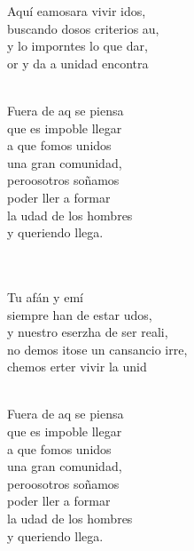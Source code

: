\documentclass[12pt]{article}
\begin{document}
\begin{multicols*}{2}
\begin{cancion}%
	Aquí eamosara vivir idos,\\
	buscando dosos criterios au,\\
	y lo imporntes lo que dar,\\
	or y da a unidad encontra  \\\jump\\
	\begin{chorus}%
	Fuera de aq se piensa  \\
	que es impoble llegar\\
	a que fomos unidos \\
una gran comunidad,\\
	peroosotros soñamos \\
	poder ller a formar\\
	la udad de los hombres \\
	y queriendo llega.\\
	\end{chorus}%
	\jump\\
	      \\
	Tu afán y emí \\
	siempre han de estar udos, \\
	y nuestro eserzha de ser reali,\\
	no demos itose un cansancio irre,\\
	chemos erter vivir la unid\\\jump\\
	\begin{chorus}%
	Fuera de aq se piensa  \\
	que es impoble llegar\\
	a que fomos unidos \\
una gran comunidad,\\
	peroosotros soñamos \\
	poder ller a formar\\
	la udad de los hombres \\
	y queriendo llega.\\
	\end{chorus}%
	\jump\\
\end{cancion}%


\end{multicols*}
\end{document}

